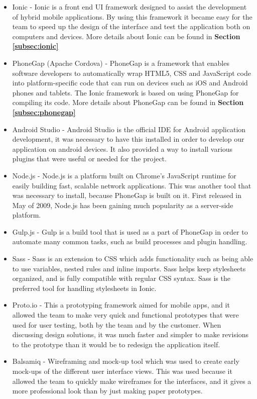 \begin{itemize}
	\item Ionic \cite{es1} - Ionic is a front end UI framework designed to assist the development of hybrid mobile applications. By using this framework it became easy for the team to speed up the design of the interface and test the application both on computers and devices. More details about Ionic can be found in \textbf{Section \ref{subsec:ionic}}
	\item PhoneGap (Apache Cordova) \cite{RA2} - PhoneGap is a framework that enables software developers to automatically wrap HTML5, CSS and JavaScript code into platform-specific code that can run on devices such as iOS and Android phones and tablets. The Ionic framework is based on using PhoneGap for compiling its code. More details about PhoneGap can be found in \textbf{Section \ref{subsec:phonegap}}
	\item Android Studio \cite{es22} - Android Studio is the official IDE for Android application development, it was necessary to have this installed in order to develop our application on android devices. It also provided a way to install various plugins that were useful or needed for the project.
	\item Node.js \cite{es23} - Node.js is a platform built on Chrome's JavaScript runtime for easily building fast, scalable network applications. This was another tool that was necessary to install, because PhoneGap is built on it. First released in May of 2009, Node.js has been gaining much popularity as a server-side platform. 
	\item Gulp.js \cite{es24} - Gulp is a build tool that is used as a part of PhoneGap in order to automate many common tasks, such as build processes and plugin handling.
	\item Sass \cite{es25} - Sass is an extension to CSS which adds functionality such as being able to use variables, nested rules and inline imports. Sass helps keep stylesheets organized, and is fully compatible with regular CSS syntax. Sass is the preferred tool for handling stylesheets in Ionic.
	\item Proto.io \cite{protoIO} - This a prototyping framework aimed for mobile apps, and it allowed the team to make very quick and functional prototypes that were used for user testing, both by the team and by the customer. When discussing design solutions, it was much faster and simpler to make revisions to the prototype than it would be to redesign the application itself. 
	\item Balsamiq \cite{es3} - Wireframing and mock-up tool which was used to create early mock-ups of the different user interface views. This was used because it allowed the team to quickly make wireframes for the interfaces, and it gives a more professional look than by  just making paper prototypes.

\end{itemize}
